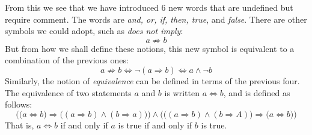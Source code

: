     From this we see that we have introduced 6 new words that are undefined but
    require comment. The words are \textit{and, or, if, then, true}, and
    \textit{false}. There are other symbols we could adopt, such as
    \textit{does not imply}:
    \begin{equation*}
        a\not\Rightarrow{b}
    \end{equation*}
    But from how we shall define these notions, this new symbol is equivalent to
    a combination of the previous ones:
    \begin{equation*}
        a\not\Rightarrow{b}\Longleftrightarrow
        \neg(a\Rightarrow{b})
        \Longleftrightarrow
        a\land\neg{b}
    \end{equation*}
    Similarly, the notion of \textit{equivalence} can be defined in terms of
    the previous four. The equivalence of two statements $a$ and $b$ is written
    $a\Leftrightarrow{b}$, and is defined as follows:
    \begin{equation*}
        \Big(\big(a\Leftrightarrow{b}\big)\Rightarrow
             \big((a\Rightarrow{b})\land(b\Rightarrow{a})\big)\Big)
        \land\Big(\big((a\Rightarrow{b})\land(b\Rightarrow{A})\big)
            \Rightarrow\big(a\Leftrightarrow{b}\big)\Big)
    \end{equation*}
    That is, $a\Leftrightarrow{b}$ if and only if $a$ is true if and only if $b$
    is true.
